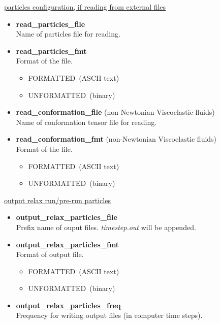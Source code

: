 \documentclass[a4paper,10pt]{article}
\begin{document}
\begin{center}
\underline{\textlangle particles configuration, if reading from external files \textrangle}
\end{center}

\begin{itemize}
 \item \textbf{read\_particles\_file} \\
Name of particles file for reading. 
 \item \textbf{read\_particles\_fmt} \\
Format of the file. 
  \begin{itemize}
  \item
  FORMATTED~(ASCII text)
  \item
  UNFORMATTED~(binary)
  \end{itemize}
\end{itemize}

\begin{itemize}
          
\item \textbf{read\_conformation\_file} 
(non-Newtonian Viscoelastic fluids)\\
Name of conformation tensor file for reading.

\item \textbf{read\_conformation\_fmt}
(non-Newtonian Viscoelastic fluids) \\
Format of the file.
\begin{itemize}
\item
FORMATTED~(ASCII text)
\item
UNFORMATTED~(binary)
\end{itemize}

\end{itemize}

\begin{center}
\underline{\textlangle output relax run/pre-run particles \textrangle}
\end{center}

\begin{itemize}
           
\item \textbf{output\_relax\_particles\_file} \\
Prefix name of ouput files. 
\textit{timestep.out} will be appended.
\item\textbf{ output\_relax\_particles\_fmt} \\
Format of output file.

\begin{itemize}
 \item 
FORMATTED~(ASCII text)
 \item
UNFORMATTED~(binary)
\end{itemize}

\item\textbf{output\_relax\_particles\_freq }\\
Frequency for writing output files
(in computer time steps).
\end{itemize}
\end{document}
